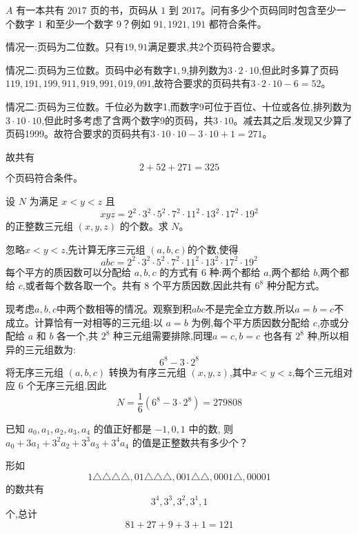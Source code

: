 \begin{questions}
    \question $A$ 有一本共有 $2017$ 页的书，页码从 $1$ 到 $2017$。问有多少个页码同时包含至少一个数字 $1$ 和至少一个数字 $9$？例如 $91,1921,191$ 都符合条件。
    \begin{solution}
        情况一:页码为二位数。只有$19,91$满足要求,共2个页码符合要求。

        情况二:页码为三位数。页码中必有数字$1,9$,排列数为$3\cdot 2\cdot 10$,但此时多算了页码$119,191,199,911,919,991,019,091$,故符合要求的页码共有$3\cdot 2\cdot 10-6=52$。

        情况二:页码为三位数。千位必为数字1,而数字9可位于百位、十位或各位,排列数为$3\cdot 10\cdot 10$,但此时多考虑了含两个数字9的页码，共$3\cdot 10$。减去其之后,发现又少算了页码1999。故符合要求的页码共有$3\cdot 10\cdot 10-3\cdot 10+1=271$。

        故共有
        \[
        2+52+271=325
        \]
        个页码符合条件。
    \end{solution}

    \question 设 $N$ 为满足 $x < y < z$ 且
    \[
    xyz = 2^2 \cdot 3^2 \cdot 5^2 \cdot 7^2 \cdot 11^2 \cdot 13^2 \cdot 17^2 \cdot 19^2
    \]
    的正整数三元组 $(x, y, z)$ 的个数。求 $N$。
    \begin{solution}
        忽略$x < y < z$,先计算无序三元组 $(a,b,c)$的个数,使得
        \[
        abc = 2^2 \cdot 3^2 \cdot 5^2 \cdot 7^2 \cdot 11^2 \cdot 13^2 \cdot 17^2 \cdot 19^2
        \]
        每个平方的质因数可以分配给 $a,b,c$ 的方式有 6 种:两个都给 $a$,两个都给 $b$,两个都给 $c$,或者每个数各取一个。共有 8 个平方质因数,因此共有 $6^8$ 种分配方式。

        现考虑$a,b,c$中两个数相等的情况。观察到积$abc$不是完全立方数,所以$a=b=c$不成立。计算恰有一对相等的三元组:以 $a=b$ 为例,每个平方质因数分配给 $c$,亦或分配给 $a$ 和 $b$ 各一个,共 $2^8$ 种三元组需要排除,同理$a=c,b=c$ 也各有 $2^8$ 种,所以相异的三元组数为:
        \[
        6^8 - 3\cdot 2^8
        \]
        将无序三元组 $(a,b,c)$ 转换为有序三元组 $(x,y,z)$,其中$x<y<z$,每个三元组对应 6 个无序三元组,因此
        \[
        N = \frac{1}{6}(6^8 - 3\cdot 2^8) = 279808
        \]
    \end{solution}

    \question 已知 $a_0, a_1, a_2, a_3, a_4$ 的值正好都是 $-1, 0, 1$ 中的数, 则 $a_0 + 3a_1 + 3^2a_2 + 3^3a_3 + 3^4a_4$ 的值是正整数共有多少个？
    \begin{solution}
        形如
        \[
        1\triangle \triangle \triangle \triangle,01\triangle \triangle \triangle,
        001\triangle \triangle,
        0001\triangle,
        00001
        \]
        的数共有
        \[
        3^4,3^3,3^2,3^1,1
        \]
        个,总计
        \[
        81 + 27 + 9 + 3 + 1 = 121
        \]
    \end{solution}


\end{questions}
